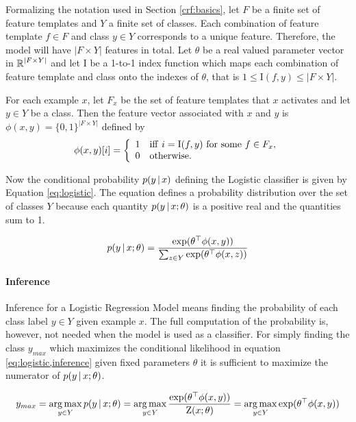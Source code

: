 Formalizing the notation used in Section \ref{crf:basics}, let $F$ be
a finite set of feature templates and $Y$ a finite set of
classes. Each combination of feature template $f \in F$ and class $y
\in Y$ corresponds to a unique feature. Therefore, the model will have
$|F \times Y|$ features in total. Let $\theta$ be a real valued
parameter vector in $\mbox{$\mathbb R$}^{|F \times Y|}$ and let ${\mathrm I}$ be a
1-to-1 index function which maps each combination of feature template
and class onto the indexes of $\theta$, that is $1 \leq {\mathrm I}(f,
y) \leq |F \times Y|$.

For each example $x$, let $F_x$ be the set of feature templates that $x$ activates and let $y \in Y$ be a class. Then the feature vector associated with $x$ and $y$ is $\phi(x,y) = \{0, 1\}^{|F \times Y|}$ defined by
\[
  \phi(x,y)[i] = \left\{
  \begin{array}{ll}
  1 & {\rm iff\ } i = {\mathrm I}(f,y) {\rm\ for\ some\ }f \in F_x{\rm,} \\ 
  0 & {\rm otherwise.}  
  \end{array}
  \right.
\]


Now the conditional probability $p(y\mbox{$ \, | \, $} x)$ defining the Logistic
classifier is given by Equation \eqref{eq:logistic}. The equation
defines a probability distribution over the set of classes $Y$ because
each quantity $p(y\mbox{$ \, | \, $} x\mbox{$ ; \, $}\theta)$ is a positive real and the
quantities sum to 1. 

\begin{equation}
p(y\mbox{$ \, | \, $} x\mbox{$ ; \, $} \theta) = \frac{\exp(\theta^\top \phi(x,y))}{\sum_{z \in Y}\exp(\theta^\top \phi(x,z))}\label{eq:logistic}
\end{equation}

\paragraph{Inference} Inference for a Logistic Regression Model means finding the
probability of each class label $y \in Y$ given example $x$. The full
computation of the probability is, however, not needed when the model
is used as a classifier. For simply finding the class $y_{max}$ which
maximizes the conditional likelihood in equation
\ref{eq:logistic,inference} given fixed parameters $\theta$ it is
sufficient to maximize the numerator of $p(y \mbox{$ \, | \, $} x\mbox{$ ; \, $}\theta)$.

\begin{equation}y_{max} = \operatorname*{arg\,max}_{y \in Y} p(y\mbox{$ \, | \, $} x\mbox{$ ; \, $} \theta) = \operatorname*{arg\,max}_{y\in Y} \frac{\exp(\theta^\top \phi(x,y))}{\mbox{${\rm Z}$}(x;\theta)} = \operatorname*{arg\,max}_{y \in Y} \exp(\theta^\top \phi(x,y))\label{eq:logistic,inference}\end{equation}

